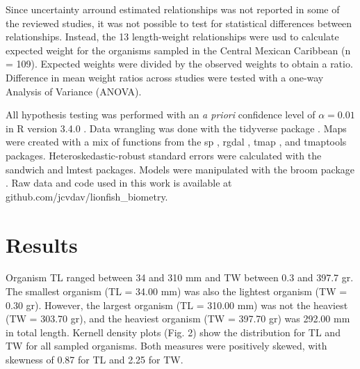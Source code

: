 \documentclass[fleqn,10pt,lineno]{wlpeerj} %
\theoremstyle{definition}
\theoremstyle{definition}
\theoremstyle{definition}
\theoremstyle{remark}
\begin{document}
Since uncertainty arround estimated relationships was not reported in
some of the reviewed studies, it was not possible to test for
statistical differences between relationships. Instead, the 13
length-weight relationships were usd to calculate expected weight for
the organisms sampled in the Central Mexican Caribbean (n = 109).
Expected weights were divided by the observed weights to obtain a ratio.
Difference in mean weight ratios across studies were tested with a
one-way Analysis of Variance (ANOVA).

All hypothesis testing was performed with an \emph{a priori} confidence
level of \(\alpha = 0.01\) in R version 3.4.0 \citep{rcore_2017}. Data
wrangling was done with the tidyverse package \citep{tidyverse_2017}.
Maps were created with a mix of functions from the sp \citep{sp_2017},
rgdal \citep{rgdal_2017}, tmap \citep{tmap_2017}, and tmaptools
\citep{tmaptools_2017} packages. Heteroskedastic-robust standard errors
were calculated with the sandwich \citep{sandwich_2014} and lmtest
\citep{lmtest_2002} packages. Models were manipulated with the broom
package \citep{broom_2017}. Raw data and code used in this work is
available at github.com/jcvdav/lionfish\_biometry.

\section{Results}\label{results}

Organism TL ranged between 34 and 310 mm and TW between 0.3 and 397.7
gr. The smallest organism (TL = 34.00 mm) was also the lightest organism
(TW = 0.30 gr). However, the largest organism (TL = 310.00 mm) was not
the heaviest (TW = 303.70 gr), and the heaviest organism (TW = 397.70
gr) was 292.00 mm in total length. Kernell density plots (Fig. 2) show
the distribution for TL and TW for all sampled organisms. Both measures
were positively skewed, with skewness of 0.87 for TL and 2.25 for TW.
\end{document}
